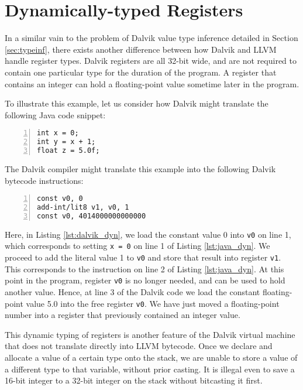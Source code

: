 \section{Dynamically-typed Registers}
\label{sec:dyntype}

In a similar vain to the problem of Dalvik value type inference detailed in Section \ref{sec:typeinf}, there exists another difference between how Dalvik and LLVM handle register types. Dalvik registers are all 32-bit wide, and are not required to contain one particular type for the duration of the program. A register that contains an integer can hold a floating-point value sometime later in the program. 

To illustrate this example, let us consider how Dalvik might translate the following Java code snippet:

\lstset{
	language=Java,
	basicstyle=\small,
	stringstyle=\ttfamily
}

\begin{lstlisting}[frame=single, numbers=left, numberstyle=\tiny, caption={Java Dynamic Typing}, label=lst:java_dyn]
int x = 0;
int y = x + 1;
float z = 5.0f;
\end{lstlisting}

The Dalvik compiler might translate this example into the following Dalvik bytecode instructions:


\lstset{
	language=Assembly,
	basicstyle=\small,
	stringstyle=\ttfamily
}

\begin{lstlisting}[frame=single, numbers=left, numberstyle=\tiny, caption={Dalvik bytecode for Listing \ref{lst:java_dyn}}, label=lst:dalvik_dyn]
const v0, 0
add-int/lit8 v1, v0, 1
const v0, 4014000000000000
\end{lstlisting}

Here, in Listing \ref{lst:dalvik_dyn}, we load the constant value 0 into \verb|v0| on line 1, which corresponds to setting \verb|x = 0| on line 1 of Listing \ref{lst:java_dyn}. We proceed to add the literal value 1 to \verb|v0| and store that result into register \verb|v1|. This corresponds to the instruction on line 2 of Listing \ref{lst:java_dyn}. At this point in the program, register \verb|v0| is no longer needed, and can be used to hold another value. Hence, at line 3 of the Dalvik code we load the constant floating-point value 5.0 into the free register \verb|v0|. We have just moved a floating-point number into a register that previously contained an integer value.

This dynamic typing of registers is another feature of the Dalvik virtual machine that does not translate directly into LLVM bytecode. Once we declare and allocate a value of a certain type onto the stack, we are unable to store a value of a different type to that variable, without prior casting. It is illegal even to save a 16-bit integer to a 32-bit integer on the stack without bitcasting it first.

